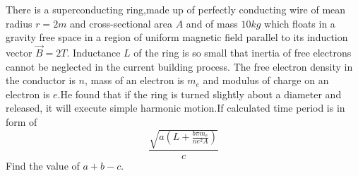 \documentclass[11pt,a4paper]{scrartcl}
\begin{document}
\begin{problem}

There is a superconducting ring,made up of perfectly conducting wire of mean radius $r=2m$ and cross-sectional area $A$ and of mass $10kg$ which floats in a gravity free space in a region of uniform magnetic field parallel to its induction vector  $\vec{B}=2T$. Inductance $L$ of the ring is so small that inertia of free electrons cannot be neglected in the current building process. The free electron density in the conductor is $n$, mass of an electron is $m_{e}$ and modulus of charge on an electron is $e$.He found that if the ring is turned slightly about a diameter and released, it will execute simple harmonic motion.If calculated time period is in form of \[\frac{\sqrt{a\left(L+\frac{ b \pi m_e}{ne^2 A}\right)}}{c}\] 
Find the value of $a+b-c$.


\begin{center}
    


\begin{tikzpicture}[x=0.75pt,y=0.75pt,yscale=-1,xscale=1]


\end{tikzpicture}
\end{center}
\end{problem}
\end{document}
